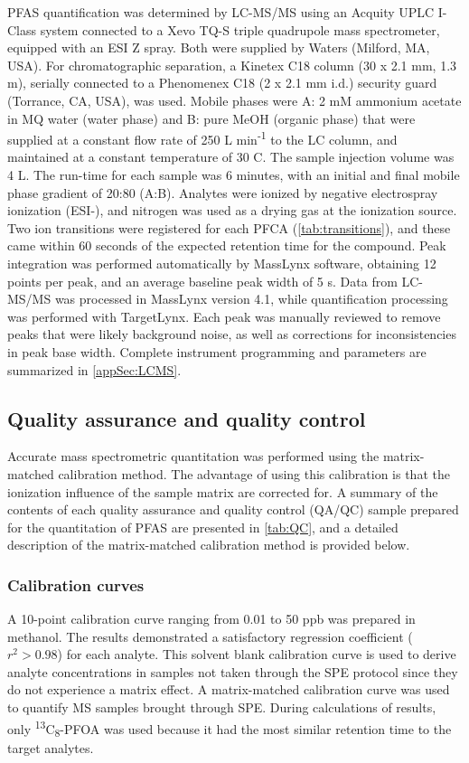 PFAS quantification was determined by \acrshort{LC-MS/MS} using an Acquity UPLC I-Class system connected to a Xevo TQ-S triple quadrupole mass spectrometer, equipped with an ESI Z spray. Both were supplied by Waters (Milford, MA, USA). For chromatographic separation, a Kinetex C18 column (30 x 2.1 mm, 1.3 \textmu m), serially connected to a Phenomenex C18 (2 x 2.1 mm i.d.) security guard (Torrance, CA, USA), was used. Mobile phases were A: 2 mM ammonium acetate in MQ water (water phase) and B: pure MeOH (organic phase) that were supplied at a constant flow rate of 250 \textmu L min\textsuperscript{-1} to the LC column, and maintained at a constant temperature of 30 \textdegree C. The sample injection volume was 4 \textmu L. The run-time for each sample was 6 minutes, with an initial and final mobile phase gradient of 20:80 (A:B). Analytes were ionized by negative electrospray ionization (\acrshort{ESI}-), and nitrogen was used as a drying gas at the ionization source. Two ion transitions were registered for each PFCA (\cref{tab:transitions}), and these came within 60 seconds of the expected retention time for the compound. Peak integration was performed automatically by MassLynx software, obtaining 12 points per peak, and an average baseline peak width of 5 s. Data from LC-MS/MS was processed in MassLynx version 4.1, while quantification processing was performed with TargetLynx. Each peak was manually reviewed to remove peaks that were likely background noise, as well as corrections for inconsistencies in peak base width. Complete instrument programming and parameters are summarized in \cref{appSec:LCMS}.



\subsection{Quality assurance and quality control}
Accurate mass spectrometric quantitation was performed using the matrix-matched calibration method. The advantage of using this calibration is that the ionization influence of the sample matrix are corrected for. A summary of the contents of each quality assurance and quality control (QA/QC) sample prepared for the quantitation of PFAS are presented in \cref{tab:QC}, and a detailed description of the matrix-matched calibration method is provided below.

\subsubsection{Calibration curves}
A 10-point calibration curve ranging from 0.01 to 50 ppb was prepared in methanol. The results demonstrated a satisfactory regression coefficient ($r^2 > 0.98$) for each analyte. This solvent blank calibration curve is used to derive analyte concentrations in samples not taken through the SPE protocol since they do not experience a matrix effect. A matrix-matched calibration curve was used to quantify MS samples brought through SPE. During calculations of results, only \textsuperscript{13}C\textsubscript{8}-PFOA was used because it had the most similar retention time to the target analytes. 

